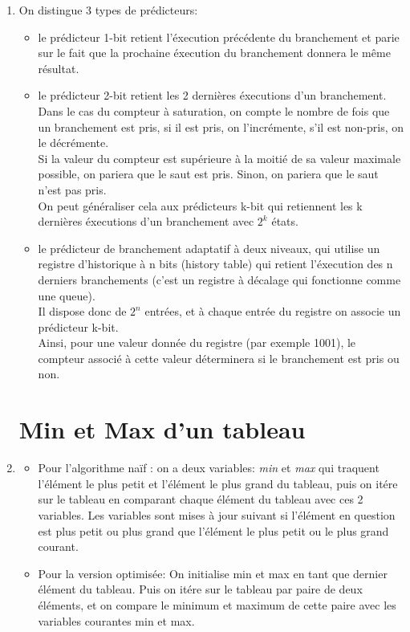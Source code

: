 \documentclass[paper=a4, fontsize=11pt]{scrartcl}
\numberwithin{equation}{section}		%
\numberwithin{figure}{section}			%
\numberwithin{table}{section}				%
\begin{document}
\begin{enumerate}
	\item 

On distingue 3 types de prédicteurs: \\
\begin{itemize}
\item le prédicteur 1-bit retient l'éxecution précédente du branchement et parie sur le fait que la prochaine
éxecution du branchement donnera le même résultat. \\

\item le prédicteur 2-bit retient les 2 dernières éxecutions d'un branchement. \\
Dans le cas du compteur à saturation, on compte le nombre de fois que un branchement est pris, si il est pris,
on l'incrémente, s'il est non-pris, on le décrémente. \\
Si la valeur du compteur est supérieure à la moitié de sa valeur maximale possible, on pariera que le saut est pris.
Sinon, on pariera que le saut n'est pas pris.\\
On peut généraliser cela aux prédicteurs k-bit qui retiennent les k dernières éxecutions d'un branchement avec \(2^k\) états. \\

\item le prédicteur de branchement adaptatif à deux niveaux, qui utilise un registre d'historique à n bits (history table)
qui retient l'éxecution des n derniers branchements (c'est un registre à décalage qui fonctionne comme une queue). \\
Il dispose donc de \(2^n\) entrées, et à chaque entrée du registre on associe un prédicteur k-bit. \\
Ainsi, pour une valeur donnée du registre (par exemple 1001), le compteur associé à cette valeur déterminera
si le branchement est pris ou non.

\end{itemize}


\section{Min et Max d’un tableau}
	\item 

\begin{itemize}
\item Pour l'algorithme naïf : on a deux variables: \textit{min} et \textit{max} qui traquent l'élément le plus petit et l'élément le plus grand du tableau, puis on itére sur le tableau en comparant chaque élément du tableau avec ces 2 variables.
Les variables sont mises à jour suivant si l'élément en question est plus petit ou plus grand que l'élément le plus petit ou le plus grand courant.
\item 
Pour la version optimisée:
On initialise min et max en tant que dernier élément du tableau.
Puis on itére sur le tableau par paire de deux éléments, et on compare le minimum et maximum de cette paire avec les variables courantes min et max.
\end{itemize}



\end{enumerate}
\end{document}
